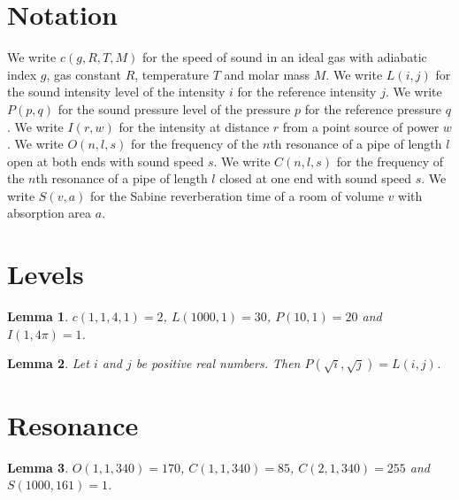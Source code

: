 \documentclass{article}
\newtheorem{lemma}{Lemma}
\begin{document}
\section{Notation}

We write $c(g,R,T,M)$ for the speed of sound in an ideal gas with adiabatic index $g$, gas constant $R$, temperature $T$ and molar mass $M$.
We write $L(i,j)$ for the sound intensity level of the intensity $i$ for the reference intensity $j$.
We write $P(p,q)$ for the sound pressure level of the pressure $p$ for the reference pressure $q$.
We write $I(r,w)$ for the intensity at distance $r$ from a point source of power $w$.
We write $O(n,l,s)$ for the frequency of the $n$th resonance of a pipe of length $l$ open at both ends with sound speed $s$.
We write $C(n,l,s)$ for the frequency of the $n$th resonance of a pipe of length $l$ closed at one end with sound speed $s$.
We write $S(v,a)$ for the Sabine reverberation time of a room of volume $v$ with absorption area $a$.

\section{Levels}

\begin{lemma}\label{levels}
$c(1,1,4,1)=2$, $L(1000,1)=30$, $P(10,1)=20$ and $I(1,4\pi)=1$.
\end{lemma}

\begin{lemma}\label{pressure}
Let $i$ and $j$ be positive real numbers. Then $P(\sqrt{i},\sqrt{j})=L(i,j)$.
\end{lemma}

\section{Resonance}

\begin{lemma}\label{pipes}
$O(1,1,340)=170$, $C(1,1,340)=85$, $C(2,1,340)=255$ and $S(1000,161)=1$.
\end{lemma}
\end{document}
